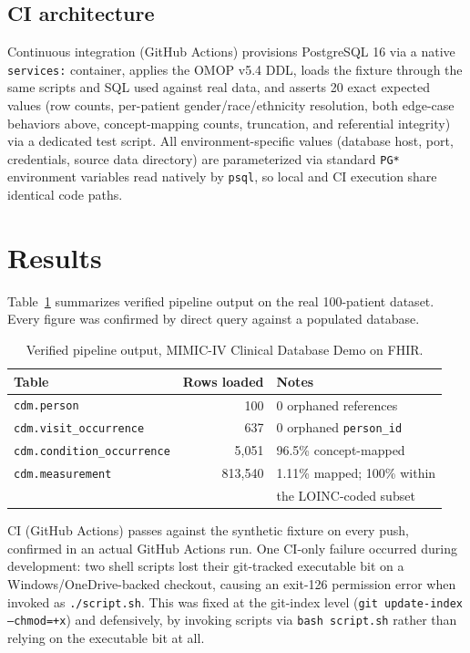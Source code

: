 \documentclass[11pt]{article}
\begin{document}
\subsection{CI architecture}

Continuous integration (GitHub Actions) provisions PostgreSQL 16 via a
native \texttt{services:} container, applies the OMOP v5.4 DDL, loads the
fixture through the same scripts and SQL used against real data, and
asserts 20 exact expected values (row counts, per-patient
gender/race/ethnicity resolution, both edge-case behaviors above,
concept-mapping counts, truncation, and referential integrity) via a
dedicated test script. All environment-specific values (database host,
port, credentials, source data directory) are parameterized via standard
\texttt{PG*} environment variables read natively by \texttt{psql}, so local
and CI execution share identical code paths.

\section{Results}

Table~\ref{tab:results} summarizes verified pipeline output on the real
100-patient dataset. Every figure was confirmed by direct query against a
populated database.

\begin{table}[h]
\centering
\caption{Verified pipeline output, MIMIC-IV Clinical Database Demo on FHIR.}
\label{tab:results}
\begin{tabular}{lrl}
\toprule
Table & Rows loaded & Notes \\
\midrule
\texttt{cdm.person} & 100 & 0 orphaned references \\
\texttt{cdm.visit\_occurrence} & 637 & 0 orphaned \texttt{person\_id} \\
\texttt{cdm.condition\_occurrence} & 5{,}051 & 96.5\% concept-mapped \\
\texttt{cdm.measurement} & 813{,}540 & 1.11\% mapped; 100\% within \\
& & the LOINC-coded subset \\
\bottomrule
\end{tabular}
\end{table}

CI (GitHub Actions) passes against the synthetic fixture on every push,
confirmed in an actual GitHub Actions run. One CI-only failure occurred during development: two shell scripts
lost their git-tracked executable bit on a Windows/OneDrive-backed
checkout, causing an exit-126 permission error when invoked as
\texttt{./script.sh}. This was fixed at the git-index level
(\texttt{git update-index --chmod=+x}) and defensively, by invoking scripts
via \texttt{bash script.sh} rather than relying on the executable bit at
all.
\end{document}

